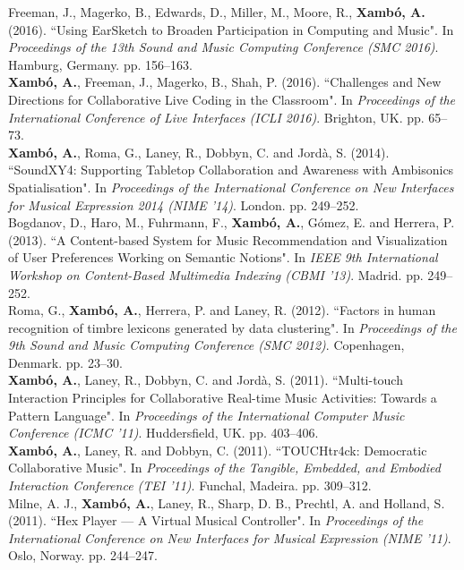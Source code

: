 \documentclass[10pt, a4paper]{article}
\newcommand{\years}[1]{\marginnote{\scriptsize #1}}
\begin{document}
\years{2016b}Freeman, J., Magerko, B., Edwards, D., Miller, M., Moore, R., \textbf{Xambó, A.} (2016). “Using EarSketch to Broaden Participation in Computing and Music". In \emph{Proceedings of the 13th Sound and Music Computing Conference (SMC 2016)}. Hamburg, Germany. pp. 156--163.\\
\years{2016a}\textbf{Xambó, A.}, Freeman, J., Magerko, B., Shah, P. (2016). “Challenges and New Directions for Collaborative Live Coding in the Classroom". In \emph{Proceedings of the International Conference of Live Interfaces (ICLI 2016)}. Brighton, UK. pp. 65--73.\\
\years{2014}\textbf{Xambó, A.}, Roma, G., Laney, R., Dobbyn, C. and Jordà, S. (2014). “SoundXY4: Supporting Tabletop Collaboration and Awareness with Ambisonics Spatialisation". In \emph{Proceedings of the International Conference on New Interfaces for Musical Expression 2014 (NIME '14)}. London. pp. 249--252.\\
\years{2013}Bogdanov, D., Haro, M., Fuhrmann, F., \textbf{Xambó, A.}, Gómez, E. and Herrera, P. (2013). “A Content-based System for Music Recommendation and Visualization of User Preferences Working on Semantic Notions". In \emph{IEEE 9th International Workshop on Content-Based Multimedia Indexing (CBMI '13)}. Madrid. pp. 249--252.\\
\years{2012}Roma, G., \textbf{Xambó, A.}, Herrera, P. and Laney, R. (2012). “Factors in human recognition of timbre lexicons generated by data clustering". In \emph{Proceedings of the 9th Sound and Music Computing Conference (SMC 2012)}. Copenhagen, Denmark. pp. 23--30.\\
\years{2011c}\textbf{Xambó, A.}, Laney, R., Dobbyn, C. and Jordà, S. (2011). “Multi-touch Interaction Principles for Collaborative Real-time Music Activities: Towards a Pattern Language". In \emph{Proceedings of the International Computer Music Conference (ICMC '11)}. Huddersfield, UK. pp. 403--406.\\
\years{2011b}\textbf{Xambó, A.}, Laney, R. and Dobbyn, C. (2011). “TOUCHtr4ck: Democratic Collaborative Music". In \emph{Proceedings of the Tangible, Embedded, and Embodied Interaction Conference (TEI '11)}. Funchal, Madeira. pp. 309--312.\\
\years{2011a}Milne, A. J., \textbf{Xambó, A.}, Laney, R., Sharp, D. B., Prechtl, A. and Holland, S. (2011). “Hex Player — A Virtual Musical Controller". In \emph{Proceedings of the International Conference on New Interfaces for Musical Expression (NIME '11)}. Oslo, Norway. pp. 244--247.\\
\end{document}
